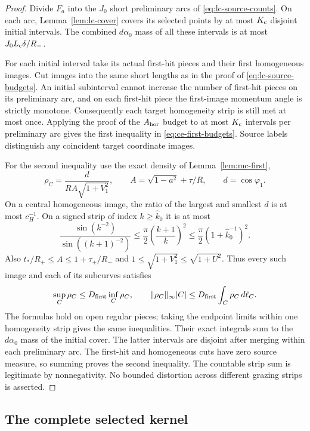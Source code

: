 \begin{proof}
Divide $F_a$ into the $J_0$ short preliminary arcs of
\eqref{eq:lc-source-counts}.  On each arc,
Lemma~\ref{lem:lc-cover} covers its selected points by at most
$K_{\rm c}$ disjoint initial intervals.  The combined
$d\alpha_0$ mass of all these intervals is at most
$J_0L_{\rm c}\delta/R_-$.

For each initial interval take its actual first-hit pieces and
their first homogeneous images.  Cut images into the same short
lengths as in the proof of \eqref{eq:lc-source-budgets}.  An initial
subinterval cannot increase the number of first-hit pieces on
its preliminary arc, and on each first-hit piece the first-image
momentum angle is strictly monotone.  Consequently each target
homogeneity strip is still met at most once.  Applying the proof
of the $A_{\rm hor}$ budget to at most $K_{\rm c}$ intervals per
preliminary arc gives the first inequality in
\eqref{eq:ce-first-budgets}.  Source labels distinguish any
coincident target coordinate images.

For the second inequality use the exact density of
Lemma~\ref{lem:mc-first},
\[
 \rho_C=\frac{d}{R A\sqrt{1+V_1^2}},\qquad
 A=\sqrt{1-a^2}+\tau/R,\qquad
 d=\cos\varphi_1 .
\]
On a central homogeneous image, the ratio of the largest and
smallest $d$ is at most $c_H^{-1}$.  On a signed strip of index
$k\ge\widehat k_0$ it is at most
\[
 \frac{\sin(k^{-2})}{\sin((k+1)^{-2})}
       \le\frac{\pi}{2}\left(\frac{k+1}{k}\right)^2
       \le\frac{\pi}{2}(1+\widehat k_0^{-1})^2 .
\]
Also $t_*/R_+\le A\le1+\tau_+/R_-$ and
$1\le\sqrt{1+V_1^2}\le\sqrt{1+U^2}$.  Thus every such
image and each of its subcurves satisfies
\[
 \sup_C\rho_C\le D_{\rm first}\inf_C\rho_C,\qquad
 \|\rho_C\|_\infty|C|
                \le D_{\rm first}\int_C\rho_C\,d\ell_C .
\]
The formulas hold on open regular pieces; taking the endpoint
limits within one homogeneity strip gives the same inequalities.
Their exact integrals sum to the $d\alpha_0$ mass of the initial
cover.  The latter intervals are disjoint after merging within
each preliminary arc.  The first-hit and homogeneous cuts have
zero source measure, so summing proves the second inequality.
The countable strip sum is legitimate by nonnegativity.  No
bounded distortion across different grazing strips is asserted.
\end{proof}

\subsection{The complete selected kernel}

